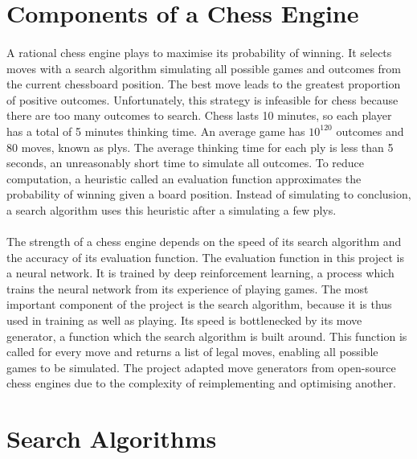 \documentclass[12pt,a4paper]{book}
\begin{document}
\section{Components of a Chess Engine}

\paragraph{} A rational chess engine plays to maximise its probability of winning. It selects moves with a search algorithm simulating all possible games and outcomes from the current chessboard position. The best move leads to the greatest proportion of positive outcomes. Unfortunately, this strategy is infeasible for chess because there are too many outcomes to search. Chess lasts 10 minutes, so each player has a total of 5 minutes thinking time. An average game has $10 ^{120}$ outcomes and 80 moves, known as plys. The average thinking time for each ply is less than 5 seconds, an unreasonably short time to simulate all outcomes. To reduce computation, a heuristic called an evaluation function approximates the probability of winning given a board position. Instead of simulating to conclusion, a search algorithm uses this heuristic after a simulating a few plys.

\paragraph{} The strength of a chess engine depends on the speed of its search algorithm and the accuracy of its evaluation function. The evaluation function in this project is a neural network. It is trained by deep reinforcement learning, a process which trains the neural network from its experience of playing games. The most important component of the project is the search algorithm, because it is thus used in training as well as playing. Its speed is bottlenecked by its move generator, a function which the search algorithm is built around. This function is called for every move and returns a list of legal moves, enabling all possible games to be simulated. The project adapted move generators from open-source chess engines due to the complexity of reimplementing and optimising another.

\section{Search Algorithms}
\end{document}
